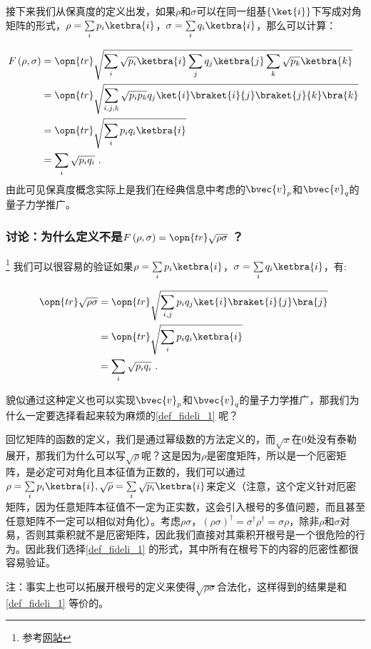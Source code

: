 接下来我们从保真度的定义出发，如果$\rho$和$\sigma$可以在同一组基$\left\{\ket{i}\right\}$下写成对角矩阵的形式，$\rho = \sum\limits_ip_i\ketbra{i}$，$\sigma = \sum\limits_iq_i\ketbra{i}$，那么可以计算：

\begin{equation}
\begin{aligned}
F\left(\rho,\sigma\right) &= \opn{tr}\sqrt{\sum_{i} \sqrt{p_i}\ketbra{i}\sum_{j}q_j\ketbra{j}\sum_k\sqrt{p_k}\ketbra{k}} \\
&= \opn{tr}\sqrt{\sum_{i,j,k}\sqrt{p_ip_k}q_j\ket{i}\braket{i}{j}\braket{j}{k}\bra{k}} \\
&= \opn{tr}\sqrt{\sum_ip_iq_i\ketbra{i}} \\
&= \sum_i\sqrt{p_iq_i}~.
\end{aligned}~
\end{equation}
由此可见保真度概念实际上是我们在经典信息中考虑的$\bvec{v}_p$和$\bvec{v}_q$的量子力学推广。

\subsubsection{讨论：为什么定义不是$F\left(\rho,\sigma\right) = \opn{tr}\sqrt{\rho\sigma}~$？}
\footnote{参考\href{https://physics.stackexchange.com/questions/532223/why-is-the-standard-definition-of-fidelity-unnecessarily-complicated}{网站}}
我们可以很容易的验证如果$\rho = \sum\limits_i p_i\ketbra{i}$，$\sigma = \sum\limits_i q_i \ketbra{i}$，有:

\begin{equation}
\begin{aligned}
\opn{tr}\sqrt{\rho\sigma} &= \opn{tr}\sqrt{\sum_{i,j}p_iq_j\ket{i}\braket{i}{j}\bra{j}} \\
&= \opn{tr}\sqrt{\sum_ip_iq_i\ketbra{i}} \\&=\sum_i\sqrt{p_iq_i}~.
\end{aligned}~
\end{equation}

貌似通过这种定义也可以实现$\bvec{v}_p$和$\bvec{v}_q$的量子力学推广，那我们为什么一定要选择看起来较为麻烦的\autoref{def_fideli_1} 呢？

回忆矩阵的函数的定义，我们是通过幂级数的方法定义的，而$\sqrt{x}$在$0$处没有泰勒展开，那我们为什么可以写$\sqrt{\rho}$呢？这是因为$\rho$是密度矩阵，所以是一个厄密矩阵，是必定可对角化且本征值为正数的，我们可以通过$\rho = \sum\limits_ip_i\ketbra{i},\sqrt{\rho} = \sum\limits_i\sqrt{p_i}\ketbra{i}$来定义（注意，这个定义针对厄密矩阵，因为任意矩阵本征值不一定为正实数，这会引入根号的多值问题，而且甚至任意矩阵不一定可以相似对角化）。考虑$\rho\sigma$，$\left(\rho\sigma\right)^\dagger = \sigma^\dagger \rho^\dagger = \sigma\rho$，除非$\rho$和$\sigma$对易，否则其乘积就不是厄密矩阵，因此我们直接对其乘积开根号是一个很危险的行为。因此我们选择\autoref{def_fideli_1} 的形式，其中所有在根号下的内容的厄密性都很容易验证。

注：事实上也可以拓展开根号的定义来使得$\sqrt{\rho\sigma}$合法化，这样得到的结果是和\autoref{def_fideli_1} 等价的。
